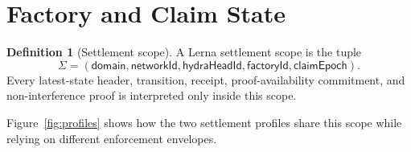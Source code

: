 \documentclass[a4paper,11pt]{article}
\theoremstyle{definition}
\newtheorem{definition}{Definition}[section]
\theoremstyle{plain}
\theoremstyle{remark}
\begin{document}
\section{Factory and Claim State}
\label{sec:state}

\begin{definition}[Settlement scope]
\label{def:scope}
A Lerna settlement scope is the tuple
\[
  \Sigma=(\mathsf{domain},\mathsf{networkId},\mathsf{hydraHeadId},
  \mathsf{factoryId},\mathsf{claimEpoch}).
\]
Every latest-state header, transition, receipt, proof-availability commitment,
and non-interference proof is interpreted only inside this scope.
\end{definition}

Figure~\ref{fig:profiles} shows how the two settlement profiles share this
scope while relying on different enforcement envelopes.
\end{document}
